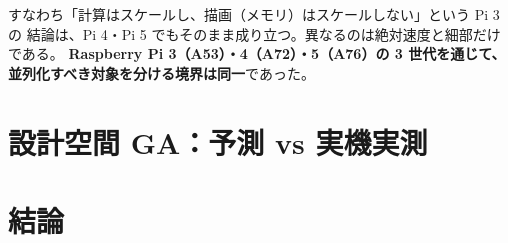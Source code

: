 \documentclass[11pt,a4paper]{article}
\begin{document}
\noindent
すなわち「計算はスケールし、描画（メモリ）はスケールしない」という Pi 3 の
結論は、Pi 4・Pi 5 でもそのまま成り立つ。異なるのは絶対速度と細部だけである。
\textbf{Raspberry Pi 3（A53）・4（A72）・5（A76）の 3 世代を通じて、
並列化すべき対象を分ける境界は同一}であった。

\section{設計空間 GA：予測 vs 実機実測}
\label{sec:ga}


\section{結論}
\label{sec:conclusion}
\end{document}
